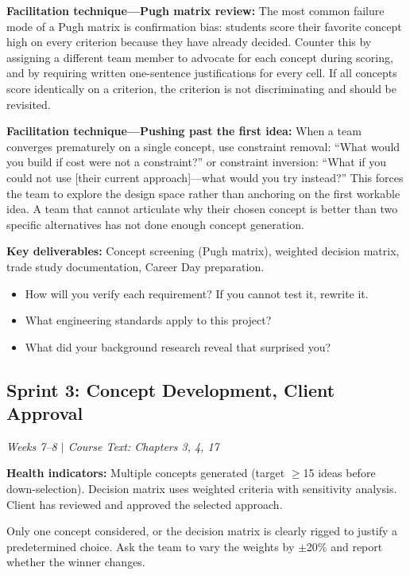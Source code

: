 \textbf{Facilitation technique---Pugh matrix review:} The most common failure mode of a Pugh matrix is confirmation bias: students score their favorite concept high on every criterion because they have already decided. Counter this by assigning a different team member to advocate for each concept during scoring, and by requiring written one-sentence justifications for every cell. If all concepts score identically on a criterion, the criterion is not discriminating and should be revisited.

\textbf{Facilitation technique---Pushing past the first idea:} When a team converges prematurely on a single concept, use constraint removal: ``What would you build if cost were not a constraint?'' or constraint inversion: ``What if you could not use [their current approach]---what would you try instead?'' This forces the team to explore the design space rather than anchoring on the first workable idea. A team that cannot articulate why their chosen concept is better than two specific alternatives has not done enough concept generation.

\textbf{Key deliverables:} Concept screening (Pugh matrix), weighted decision matrix, trade study documentation, Career Day preparation.

\begin{paquestion}
\begin{itemize}[nosep,leftmargin=1.5em]
\item How will you verify each requirement? If you cannot test it, rewrite it.
\item What engineering standards apply to this project?
\item What did your background research reveal that surprised you?
\end{itemize}
\end{paquestion}


\subsection{Sprint 3: Concept Development, Client Approval}
\textit{Weeks 7--8 $|$ Course Text: Chapters 3, 4, 17}

\textbf{Health indicators:} Multiple concepts generated (target $\geq$15 ideas before down-selection). Decision matrix uses weighted criteria with sensitivity analysis. Client has reviewed and approved the selected approach.

\begin{redflag}
Only one concept considered, or the decision matrix is clearly rigged to justify a predetermined choice. Ask the team to vary the weights by $\pm$20\% and report whether the winner changes.
\end{redflag}

